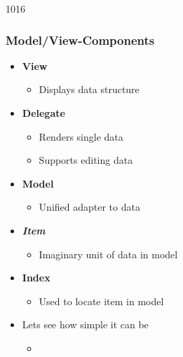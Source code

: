 \begin{slide}{1016}\frametitle{Model/View-Components}\label{model_view_concepts}
\begin{itemize}
\item \textbf{View}
  \begin{itemize}
  \item Displays data structure
  \end{itemize}
\item \textbf{Delegate}
  \begin{itemize}
  \item Renders single data
  \item Supports editing data
  \end{itemize}
\item \textbf{Model}
  \begin{itemize}
  \item Unified adapter to data
  \end{itemize}
\end{itemize}
\medskip
{}
 \begin{itemize}
 \item \textbf{\textit{Item}}
   \begin{itemize}
  \item Imaginary unit of data in model
  \end{itemize}

\item \textbf{Index}
  \begin{itemize}
  \item Used to locate item in model
  \end{itemize}

\end{itemize}
\vfill
\begin{itemize}
\item Lets see how simple it can be
  \begin{itemize}
  \item {}
  \end{itemize}
\end{itemize}
\end{slide}

